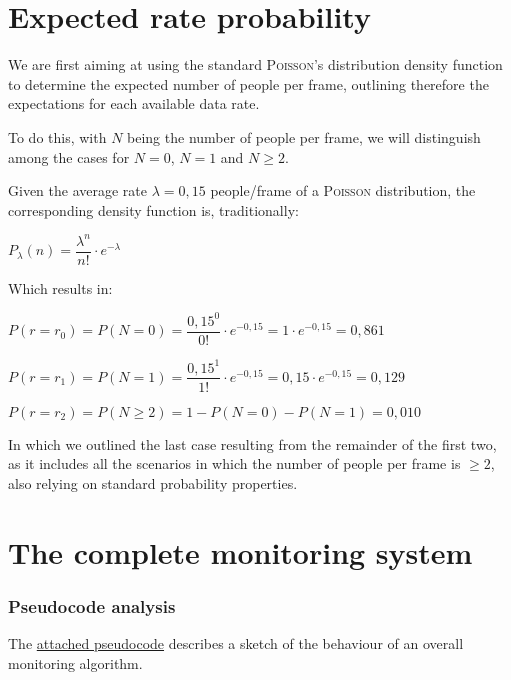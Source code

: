 \documentclass[a4paper,11pt]{article} %
\begin{document}
\section{Expected rate probability}\label{rate-probability}

We are first aiming at using the standard \textsc{Poisson}'s distribution density function to determine the expected number of people per frame, outlining therefore the expectations for each available data rate.

\smallskip

To do this, with $N$ being the number of people per frame, we will distinguish among the cases for $N = 0$, $N = 1$ and $N \geq 2$.

\medskip

Given the average rate $\lambda = 0,15$ people/frame of a \textsc{Poisson} distribution, the corresponding density function is, traditionally:

\smallskip

$P_\lambda(n) = \dfrac{\lambda^{n}}{n!} \cdot e^{-\lambda}$

\medskip

Which results in:

\smallskip

$P(r = r_0) = P(N = 0) = \dfrac{{0,15}^0}{0!} \cdot e^{-0,15} = 1 \cdot e^{-0,15} = 0,861$

\smallskip

$P(r = r_1) = P(N = 1) = \dfrac{{0,15}^{1}}{1!} \cdot e^{-0,15} = 0,15 \cdot e^{-0,15} = 0,129$

\smallskip

$P(r = r_2) = P(N \geq 2) = 1 - P(N = 0) - P(N = 1) = 0,010$

\medskip

In which we outlined the last case resulting from the remainder of the first two, as it includes all the scenarios in which the number of people per frame is $\geq 2$, also relying on standard probability properties.

\section{The complete monitoring system}

\subsubsection{Pseudocode analysis}\label{pseudocode-analysis}

The \hyperref[exercise-text]{attached pseudocode} describes a sketch of the behaviour of an overall monitoring algorithm.
\end{document}
